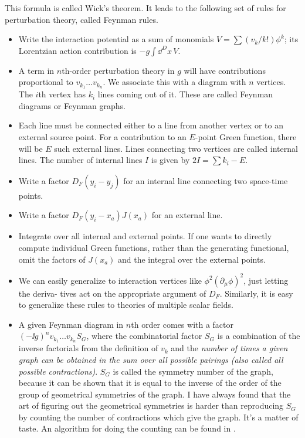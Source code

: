 This formula is called Wick's theorem. It leads to the following set of rules for
perturbation theory, called Feynman rules.

\begin{itemize}
\item Write the interaction potential as a sum of monomials $V=\sum(v_k/k!)\phi^k$; its Lorentzian action contribution is $-g\int\dd^D x\,V$.
\item A term in $n$th-order perturbation theory in $g$ will have contributions proportional
to $v_{k_1}\ldots v_{k_n}$. We associate this with a diagram with $n$ vertices. The $i$th vertex has $k_i$
lines coming out of it. These are called Feynman diagrams or Feynman graphs.
\item Each line must be connected either to a line from another vertex or to an external
source point. For a contribution to an $E$-point Green function, there will be $E$ such
external lines. Lines connecting two vertices are called internal lines. The number of
internal lines $I$ is given by $2I=\sum k_i-E$.
\item Write a factor $D_F(y_i-y_j)$ for an internal line connecting two space-time points.
\item Write a factor $D_F(y_i-x_a)J(x_a)$ for an external line.
\item Integrate over all internal and external points. If one wants to directly compute
individual Green functions, rather than the generating functional, omit the factors
of $J(x_a)$ and the integral over the external points.
\item We can easily generalize to interaction vertices like $\phi^2(\partial_\mu\phi)^2$, just letting the deriva-
tives act on the appropriate argument of $D_F$. Similarly, it is easy to generalize these
rules to theories of multiple scalar fields.
\item A given Feynman diagram in $n$th order comes with a factor $(-\ii g)^n v_{k_1}\ldots v_{k_n}S_G$, where
the combinatorial factor $S_G$ is a combination of the inverse factorials from the
definition of $v_k$ and the \emph{number of times a given graph can be obtained in the sum over
all possible pairings (also called all possible contractions)}. $S_G$ is called the symmetry
number of the graph, because it can be shown that it is equal to the inverse of the
order of the group of geometrical symmetries of the graph. I have always found that
the art of figuring out the geometrical symmetries is harder than reproducing $S_G$ by
counting the number of contractions which give the graph. It's a matter of taste. An
algorithm for doing the counting can be found in \cite{banks-ref-13}.
\end{itemize}

